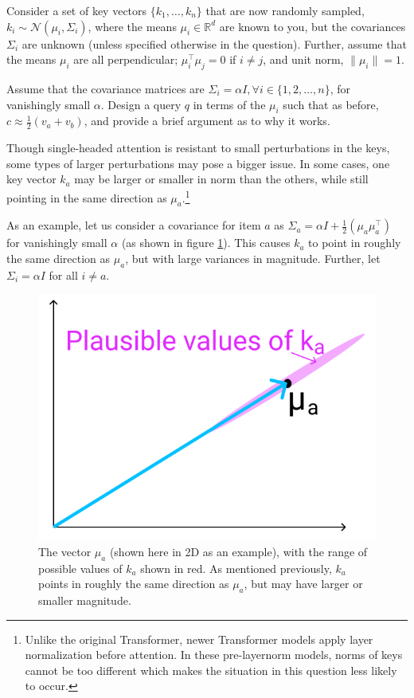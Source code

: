 \begin{parts}
Consider a set of key vectors $\{k_1,\dots,k_n\}$ that are now randomly sampled, $k_i\sim \mathcal{N}(\mu_i, \Sigma_i)$, where the means $\mu_i \in \mathbb{R}^d$ are known to you, but the covariances $\Sigma_i$ are unknown (unless specified otherwise in the question).
Further, assume that the means $\mu_i$ are all perpendicular; $\mu_i^\top \mu_j = 0$ if $i\not=j$, and unit norm, $\|\mu_i\|=1$.

\begin{subparts}
\subpart[2] Assume that the covariance matrices are $\Sigma_i = \alpha I, \forall i \in \{1, 2, \ldots, n\}$, for vanishingly small $\alpha$.
Design a query $q$ in terms of the $\mu_i$ such that as before, $c\approx \frac{1}{2}(v_a + v_b)$, and provide a brief argument as to why it works.


\subpart[3] Though single-headed attention is resistant to small perturbations in the keys, some types of larger perturbations may pose a bigger issue. In some cases, one key vector $k_a$ may be larger or smaller in norm than the others, while still pointing in the same direction as $\mu_a$.\footnote{Unlike the original Transformer, newer Transformer models apply layer normalization before attention. In these pre-layernorm models, norms of keys cannot be too different which makes the situation in this question less likely to occur.}

As an example, let us consider a covariance for item $a$ as $\Sigma_a = \alpha I + \frac{1}{2}(\mu_a\mu_a^\top)$ for vanishingly small $\alpha$ (as shown in figure \ref{ka_plausible}). This causes $k_a$ to point in roughly the same direction as $\mu_a$, but with large variances in magnitude. Further, let $\Sigma_i = \alpha I$ for all $i \neq a$.
\begin{figure}[h]
\centering
\captionsetup{justification=centering,margin=2cm}
\includegraphics[width=0.35\linewidth]{images/ka_plausible.png}
\caption{The vector $\mu_a$ (shown here in 2D as an example), with the range of possible values of $k_a$ shown in red. As mentioned previously, $k_a$ points in roughly the same direction as $\mu_a$, but may have larger or smaller magnitude.}
\label{ka_plausible}
\end{figure}


\end{subparts}
\end{parts}
